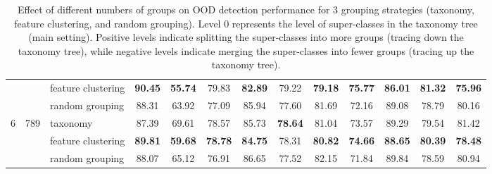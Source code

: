 \documentclass[final]{cvpr}
\begin{document}
\begin{table*}[t]
{\begin{tabular}{c|c|l|cc|cc|cc|cc|cc}
                                &                                                                                        & feature clustering                                                                                          & \textbf{90.45}       & \textbf{55.74}        & 79.83                & \textbf{82.89}        & 79.22                & \textbf{79.18}        & \textbf{75.77}       & \textbf{86.01}        & \textbf{81.32}       & \textbf{75.96}       \\
                                &                                                                                        & random grouping                                                                                             & 88.31                & 63.92                 & 77.09                & 85.94                 & 77.60                & 81.69                 & 72.16                & 89.08                 & 78.79                & 80.16                \\ \midrule
\multirow{3}{*}{6}              & \multirow{3}{*}{789}                                                                   & taxonomy                                                                                                    & 87.39                & 69.61                 & 78.57                & 85.73                 & \textbf{78.64}       & 81.04                 & 73.57                & 89.29                 & 79.54                & 81.42                \\
                                &                                                                                        & feature clustering                                                                                          & \textbf{89.81}       & \textbf{59.68}        & \textbf{78.78}       & \textbf{84.75}        & 78.31                & \textbf{80.82}        & \textbf{74.66}       & \textbf{88.65}        & \textbf{80.39}       & \textbf{78.48}       \\
                                &                                                                                        & random grouping                                                                                             & 88.07                & 65.12                 & 76.91                & 86.65                 & 77.52                & 82.15                 & 71.84                & 89.84                 & 78.59                & 80.94                \\ \bottomrule
\end{tabular}
}
\caption{\small{Effect of different numbers of groups on OOD detection performance for 3 grouping strategies (taxonomy, feature clustering, and random grouping). Level 0 represents the level of super-classes in the taxonomy tree (main setting). Positive levels indicate splitting the super-classes into more groups (tracing down the taxonomy tree), while negative levels indicate merging the super-classes into fewer groups (tracing up the taxonomy tree).}}
\label{table:group_number_ablation}
\vspace{-0.4cm}
\end{table*}
\end{document}
